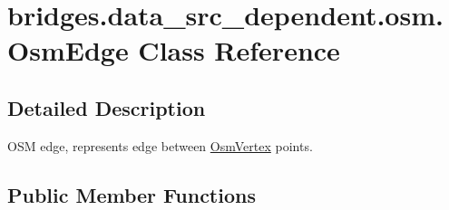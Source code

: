 \hypertarget{classbridges_1_1data__src__dependent_1_1osm_1_1_osm_edge}{}\section{bridges.\+data\+\_\+src\+\_\+dependent.\+osm.\+Osm\+Edge Class Reference}
\label{classbridges_1_1data__src__dependent_1_1osm_1_1_osm_edge}


\subsection{Detailed Description}
O\+SM edge, represents edge between \hyperlink{classbridges_1_1data__src__dependent_1_1osm_1_1_osm_vertex}{Osm\+Vertex} points. \subsection*{Public Member Functions}
